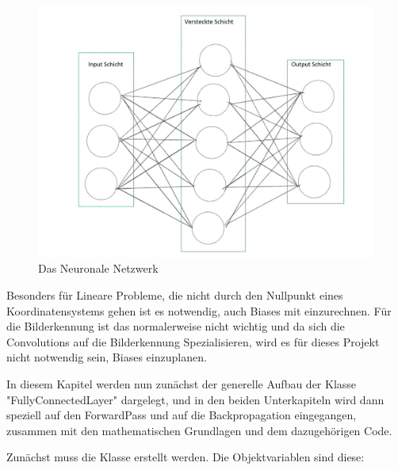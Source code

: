 \documentclass[12pt]{article}
\begin{document}
\begin{figure}[H]
\centering
\includegraphics[scale=0.50]{./Images/002_FeedForwardNetzwerk.jpg}
\caption{Das Neuronale Netzwerk}
\label{Das Neuronale Netzwerk}
\end{figure}

Besonders für Lineare Probleme, die nicht durch den Nullpunkt eines Koordinatensystems gehen ist es notwendig, auch Biases mit einzurechnen. Für die Bilderkennung ist das normalerweise nicht wichtig und da sich die Convolutions auf die Bilderkennung Spezialisieren, wird es für dieses Projekt nicht notwendig sein, Biases einzuplanen.

In diesem Kapitel werden nun zunächst der generelle Aufbau der Klasse "FullyConnectedLayer" dargelegt, und in den beiden Unterkapiteln wird dann speziell auf den ForwardPass und auf die Backpropagation eingegangen, zusammen mit den mathematischen Grundlagen und dem dazugehörigen Code.

Zunächst muss die Klasse erstellt werden. Die Objektvariablen sind diese:
    
\end{document}
